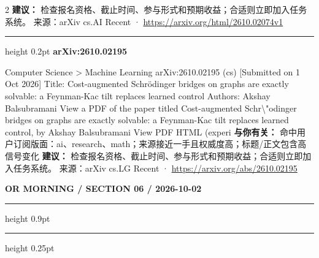 \documentclass[10.5pt]{ctexart}
\begin{document}
\begin{multicols}{2}
\textbf{建议：} 检查报名资格、截止时间、参与形式和预期收益；合适则立即加入任务系统。
{\footnotesize\color{ormuted} 来源：arXiv cs.AI Recent · \url{https://arxiv.org/html/2610.02074v1}}
\vspace{2mm}
\hrule height 0.2pt
\vspace{2mm}
{\large\bfseries arXiv:2610.02195}\par
Computer Science > Machine Learning arXiv:2610.02195 (cs) [Submitted on 1 Oct 2026] Title: Cost-augmented Schrödinger bridges on graphs are exactly solvable: a Feynman-Kac tilt replaces learned control Authors: Akshay Balsubramani View a PDF of the paper titled Cost-augmented Schr\textbackslash{}"odinger bridges on graphs are exactly solvable: a Feynman-Kac tilt replaces learned control, by Akshay Balsubramani View PDF HTML (experi
\textbf{与你有关：} 命中用户订阅版面：ai、research、math；来源接近一手且权威度高；标题/正文包含高信号变化
\textbf{建议：} 检查报名资格、截止时间、参与形式和预期收益；合适则立即加入任务系统。
{\footnotesize\color{ormuted} 来源：arXiv cs.LG Recent · \url{https://arxiv.org/abs/2610.02195}}
\end{multicols}
\newpage
{\small\bfseries OR MORNING / SECTION 06 / 2026-10-02}
\vspace{2mm}
\hrule height 0.9pt
\vspace{1.5mm}
\hrule height 0.25pt
\vspace{4mm}
\end{document}
